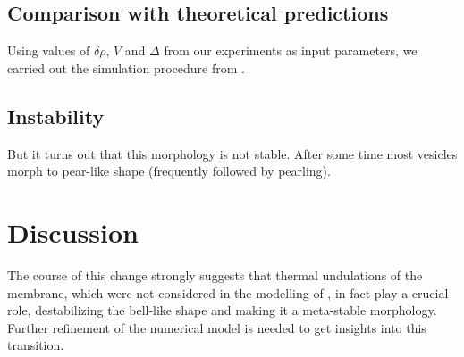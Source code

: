 \documentclass[10pt,a4paper,draft]{article}
\begin{document}
\subsection{Comparison with theoretical predictions}
Using values of $\delta\rho$, $V$ and $\Delta$ from our experiments as input parameters, we carried out the simulation procedure from \cite{Boedec2012}.

\subsection{Instability}
But it turns out that this morphology is not stable. After some time most vesicles morph to pear-like shape (frequently followed by pearling).

\section{Discussion}\label{discussion}
The course of this change strongly suggests that thermal undulations of the membrane, which were not considered in the modelling of \cite{Boedec2012}, in fact play a crucial role, destabilizing the bell-like shape and making it a meta-stable morphology. Further refinement of the numerical model is needed to get insights into this transition.


\end{document}
